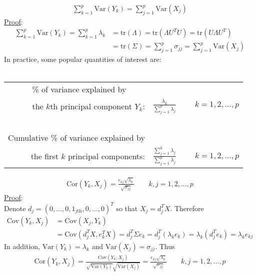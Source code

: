 \documentclass[12pt]{extarticle}
\newcommand{\<}{\langle}
\renewcommand{\>}{\rangle}
\theoremstyle{definition}
\begin{document}
\begin{tcolorbox}[enhanced, drop fuzzy shadow, title=Variance (Result 6.2)]
\begin{align*}
    \sum^p_{k=1} \text{Var}(Y_k) = \sum^p_{j=1} \text{Var}(X_j)
\end{align*}
\underline{Proof}:
\begin{align*}
    \sum^p_{k=1} \text{Var}(Y_k) = \sum^p_{k=1} \lambda_k &= \text{tr}(\Lambda) = \text{tr}(\Lambda U^T U) = \text{tr}(U \Lambda U^T)\\
    &= \text{tr}(\Sigma) = \sum^p_{j=1}\sigma_{jj} = \sum^p_{j=1} \text{Var}(X_j)
\end{align*}
In practice, some popular quantities of interest are:\\ \ \\
\begin{tabular}{rl}
\% of variance explained by $\qquad$ &\\
the $k$th principal component $Y_k$:& $\frac{\lambda_k}{\sum^p_{j=1}\lambda_j}$ $\qquad k=1,2,...,p$\\ \ \\
Cumulative \% of variance explained by &\\
the first $k$ principal components:& $\frac{\sum^k_{j=1}\lambda_j}{\sum^p_{j=1}\lambda_j}$ $\qquad k=1,2,...,p$
\end{tabular}
\end{tcolorbox}

\begin{tcolorbox}[enhanced, drop fuzzy shadow, title=Correlation with the original variable (Result 6.3)]
\begin{align*}
    \text{Cor}(Y_k, X_j) =\frac{e_{kj}\sqrt{\lambda_k}}{\sqrt{\sigma_{jj}}} \qquad k,j=1,2,...,p
\end{align*}
\underline{Proof}:\\
Denote $d_j =(0,...,0,1_{j\text{th}},0,...,0)^T$ so that $X_j =d_j^T X$. Therefore
\begin{align*}
    \text{Cov}(Y_k, X_j)&= \text{Cov}(X_j, Y_k)\\
    &=\text{Cov}(d_j^T X, e^T_k X)= d^T_j \Sigma e_k =d_j^T (\lambda_k e_k) = \lambda_k(d_j^T e_k) =\lambda_k e_{kj}
\end{align*}
In addition, $\text{Var}(Y_k)=\lambda_k$ and $\text{Var}(X_j)=\sigma_{jj}$. Thus
\begin{align*}
    \text{Cor}(Y_k, X_j)=\frac{\text{Cov}(Y_k, X_j)}{\sqrt{\text{Var}(Y_k)}\sqrt{\text{Var}(X_j)}} = \frac{e_{kj} \sqrt{\lambda_k}}{\sqrt{\sigma_{jj}}} \qquad k,j=1,2,...,p
\end{align*}
\end{tcolorbox}
\end{document}
